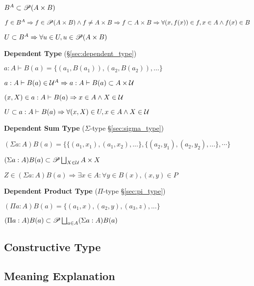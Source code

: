 $B^A \subset \mathscr{P}(A \times B)$

$f \in B^A
\Rightarrow f \in \mathscr{P}(A \times B) \wedge f \neq A \times B \allowbreak
\Rightarrow f \subset A \times B
\Rightarrow \forall (x, f(x)) \in f, x \in A \wedge f(x) \in B$

$U \subset B^A \Rightarrow \forall u \in U, u \in \mathscr{P}(A \times B)$


\textbf{Dependent Type} (\S\ref{sec:dependent_type})

$a:A \vdash B(a) = \{(a_1,B(a_1)), (a_2,B(a_2)), ...\}$

$a:A \vdash B(a) \in \class{U}^A \linebreak[1]
\Rightarrow a:A \vdash B(a) \subset A \times \class{U}$

$(x,X) \in a:A \vdash B(a) \Rightarrow x \in A \wedge X \in \mathcal{U}$

$U \subset a:A \vdash B(a) \Rightarrow \forall (x,X) \in U, x \in A
\wedge X \in \mathcal{U}$


\textbf{Dependent Sum Type} ($\Sigma$-type \S\ref{sec:sigma_type})

$(\Sigma a:A) B(a) = \{\{ (a_1, x_1), (a_1, x_2), ...\},
\{ (a_2, y_1), (a_2, y_2), ...\}, \cdots \}$

$(\Sigma a:A) B(a) \subset \mathscr{P} \bigsqcup_{X \in \mathcal{U}} A \times X$

$Z \in (\Sigma a:A) B(a) \Rightarrow \exists x \in A : \forall y \in
B(x), (x,y) \in P$



\textbf{Dependent Product Type} ($\Pi$-type \S\ref{sec:pi_type})

$(\Pi a:A) B(a) = \{(a_1, x), (a_2, y), (a_3, z), ...\}$

$(\Pi a:A) B(a) \subset \mathscr{P} \bigsqcup_{a \in A} (\Sigma a:A) B(a)$


\asterism



\subsection{Constructive Type}\label{sec:constructive_type}

\subsection{Meaning Explanation}\label{sec:meaning_explanation}

